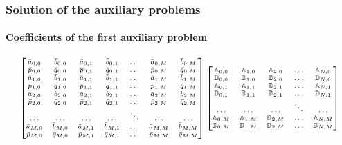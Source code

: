 \documentclass[aspectratio=169]{beamer}
\begin{document}
\begin{frame}
	\frametitle{Solution of the auxiliary problems}
	\framesubtitle{Coefficients of the first auxiliary problem}
	\begin{align*}
	\scriptsize \begin{bmatrix}
	\bar{a}_{0,0} & \bar{b}_{0,0} & \bar{a}_{0,1} & \bar{b}_{0,1} &  \ldots & \bar{a}_{0,M} & \bar{b}_{0,M} \\
	\bar{p}_{0,0} & \bar{q}_{0,0} & \bar{p}_{0,1} & \bar{q}_{0,1} &  \ldots & \bar{p}_{0,M} & \bar{q}_{0,M} \\
	\bar{a}_{1,0} & \bar{b}_{1,0} & \bar{a}_{1,1} & \bar{b}_{1,1} &  \ldots & \bar{a}_{1,M} & \bar{b}_{1,M} \\
	\bar{p}_{1,0} & \bar{q}_{1,0} & \bar{p}_{1,1} & \bar{q}_{1,1} &  \ldots & \bar{p}_{1,M} & \bar{q}_{1,M} \\
	\bar{a}_{2,0} & \bar{b}_{2,0} & \bar{a}_{2,1} & \bar{b}_{2,1} &  \ldots & \bar{a}_{2,M} & \bar{b}_{2,M} \\
	\bar{p}_{2,0} & \bar{q}_{2,0} & \bar{p}_{2,1} & \bar{q}_{2,1} &  \ldots & \bar{p}_{2,M} & \bar{q}_{2,M} \\
	\ldots & \ldots & \ldots & \ldots & \ddots & \ldots & \ldots\\
	\bar{a}_{M,0} & \bar{b}_{M,0} & \bar{a}_{M,1} & \bar{b}_{M,1} &  \ldots & \bar{a}_{M,M} & \bar{b}_{M,M} \\
	\bar{p}_{M,0} & \bar{q}_{M,0} & \bar{p}_{M,1} & \bar{q}_{M,1} &  \ldots & \bar{p}_{M,M} & \bar{q}_{M,M}
	\end{bmatrix}
	\begin{bmatrix}
	\mathbb{A}_{0,0} & \mathbb{A}_{1,0} & \mathbb{A}_{2,0} & \ldots & \mathbb{A}_{N,0} \\
	\mathbb{D}_{0,0} & \mathbb{D}_{1,0} & \mathbb{D}_{2,0} & \ldots & \mathbb{D}_{N,0} \\
	\mathbb{A}_{0,1} & \mathbb{A}_{1,1} & \mathbb{D}_{2,1} & \ldots & \mathbb{A}_{N,1} \\
	\mathbb{D}_{0,1} & \mathbb{D}_{1,1} & \mathbb{D}_{2,1} & \ldots & \mathbb{D}_{N,1} \\
	\ldots & \ldots & \ldots & \ddots & \ldots \\
	\mathbb{A}_{0,M} & \mathbb{A}_{1,M} & \mathbb{D}_{2,M} & \ldots & \mathbb{A}_{N,M} \\
	\mathbb{D}_{0,M} & \mathbb{D}_{1,M} & \mathbb{D}_{2,M} & \ldots & \mathbb{D}_{N,M}
	\end{bmatrix}
	\end{align*}
	

\end{frame}
\end{document}
